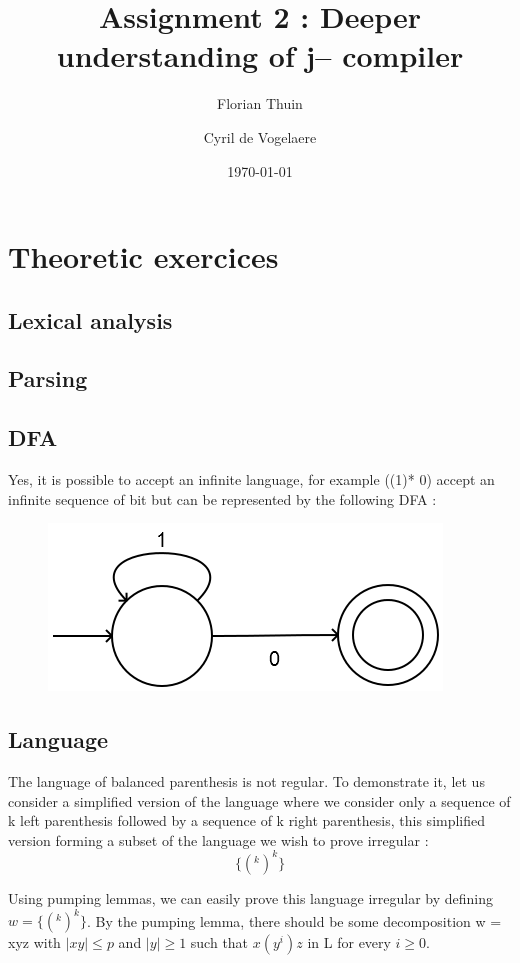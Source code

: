 \documentclass[a4paper, 11pt]{article}
\author{Florian Thuin \and Cyril de Vogelaere}
\date{\today}
\title{Assignment 2 : Deeper understanding of j-- compiler}
\begin{document}
    \maketitle
    \tableofcontents
    \section{Theoretic exercices}
    \subsection{Lexical analysis}
    \subsection{Parsing}
    \subsection{DFA}
    
    	Yes, it is possible to accept an infinite language, for example
    	((1)* 0) accept an infinite sequence of bit but can be 
    	represented by the following DFA :
    	
    	\begin{figure}[!h]
    		\center
    		\includegraphics[scale=0.5]{DFAQ3.png}
    	\end{figure}
    	
    \subsection{Language}
    
    	The language of balanced parenthesis is not regular. 
    	To demonstrate it, let us consider a simplified version of the language 
    	where we consider only a sequence of k left parenthesis followed by
    	a sequence of k right parenthesis, this simplified version forming
    	a subset of the language we wish to prove irregular :
    	\newline
    	$$\{(^k )^k\}$$
    	
    	Using pumping lemmas, we can easily prove this language irregular by defining 
    	$w = \{(^k )^k\}$. By the pumping lemma, there should be some decomposition 
    	w = xyz with $|xy| \le p$ and $|y| \ge 1$ such that $x(y^i)z$ 
    	in L for every $i \ge 0$. \newline
    	
\end{document}
